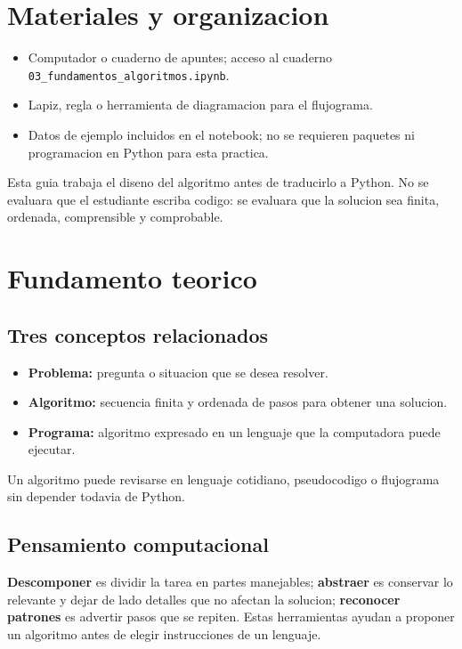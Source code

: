 \documentclass[11pt,a4paper]{article}
\newcommand{\code}[1]{\texttt{#1}}
\newcommand{\nbfile}{\code{03\_fundamentos\_algoritmos.ipynb}}
\begin{document}
\section{Materiales y organizacion}
\begin{itemize}
  \item Computador o cuaderno de apuntes; acceso al cuaderno \nbfile{}.
  \item Lapiz, regla o herramienta de diagramacion para el flujograma.
  \item Datos de ejemplo incluidos en el notebook; no se requieren paquetes ni programacion en Python para esta practica.
\end{itemize}

\begin{atencion}
Esta guia trabaja el diseno del algoritmo antes de traducirlo a Python. No se evaluara que el estudiante escriba codigo: se evaluara que la solucion sea finita, ordenada, comprensible y comprobable.
\end{atencion}

\section{Fundamento teorico}
\subsection{Tres conceptos relacionados}
\begin{itemize}
  \item \textbf{Problema:} pregunta o situacion que se desea resolver.
  \item \textbf{Algoritmo:} secuencia finita y ordenada de pasos para obtener una solucion.
  \item \textbf{Programa:} algoritmo expresado en un lenguaje que la computadora puede ejecutar.
\end{itemize}
Un algoritmo puede revisarse en lenguaje cotidiano, pseudocodigo o flujograma sin depender todavia de Python.

\subsection{Pensamiento computacional}
\textbf{Descomponer} es dividir la tarea en partes manejables; \textbf{abstraer} es conservar lo relevante y dejar de lado detalles que no afectan la solucion; \textbf{reconocer patrones} es advertir pasos que se repiten. Estas herramientas ayudan a proponer un algoritmo antes de elegir instrucciones de un lenguaje.
\end{document}
